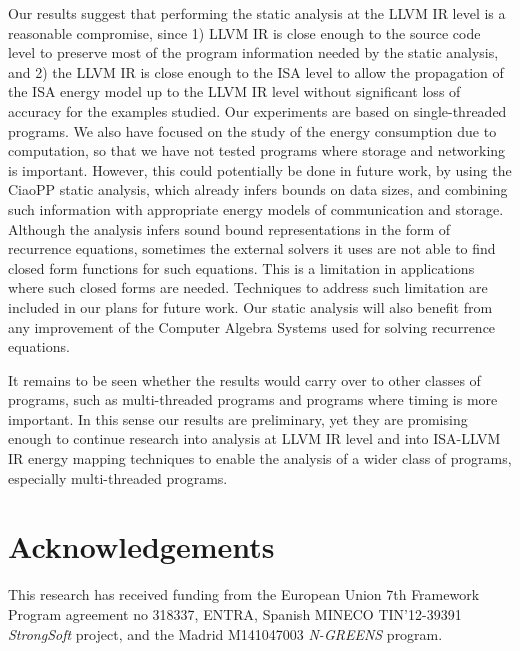 \documentclass{llncs}
\newcommand{\level}{level\xspace}
\newcommand{\llvmir}{LLVM IR\xspace}
\newcommand{\ciaopp}{CiaoPP\xspace}
\begin{document}
Our results suggest that performing the static analysis at the \llvmir
\level is a reasonable compromise, since 1) \llvmir is close enough to
the source code \level to preserve most of the program information
needed by the static analysis, and 2) the \llvmir is close enough to
the ISA \level to allow the propagation of the ISA energy model up to
the \llvmir \level without significant loss of accuracy for the
examples studied.  Our experiments are based on single-threaded
programs.
We also have focused on the study of the energy consumption due to
computation, so that we have not tested programs where storage and
networking is important. However, this could potentially be done in
future work, by using the \ciaopp static analysis, which already
infers bounds on data sizes, and combining such information with
appropriate energy models of communication and storage.
Although the analysis infers sound bound representations in the form
of recurrence equations, sometimes the external solvers it uses are
not able to find closed form functions for such equations. This is a
limitation in applications where such closed forms are needed.
Techniques to address such limitation are included in our plans for
future work. Our static analysis will also benefit from any
improvement of the Computer Algebra Systems used for solving
recurrence equations.


It remains to be seen whether the results would carry over to other
classes of programs, such as multi-threaded programs and programs
where timing is more important. In this sense our results are
preliminary, yet they are promising enough to continue research into
analysis at \llvmir \level and into ISA-\llvmir energy mapping
techniques to enable the analysis of a wider class of programs,
especially multi-threaded programs.


\section*{Acknowledgements}

This research has received funding from the European Union 7th
Framework Program agreement no 318337, ENTRA, Spanish MINECO
TIN'12-39391 \emph{StrongSoft} project, and the Madrid M141047003
\emph{N-GREENS} program.


\end{document}
